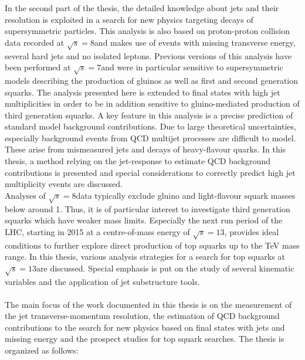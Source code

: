 In the second part of the thesis, the detailed knowledge about jets and their resolution is exploited in a search for new physics targeting decays of supersymmetric particles. This analysis is also based on proton-proton collision data recorded at $\sqrt{s} = 8$\tev and makes use of events with missing transverse energy, several hard jets and no isolated leptons. Previous versions of this analysis have been performed at $\sqrt{s} = 7$\tev and were in particular sensitive to supersymmetric models describing the production of gluinos as well as first and second generation squarks. The analysis presented here is extended to final states with high jet multiplicities in order to be in addition sensitive to gluino-mediated production of third generation squarks. A key feature in this analysis is a precise prediction of standard model background contributions. Due to large theoretical uncertainties, especially background events from QCD multijet processes are difficult to model. These arise from mismeasured jets and decays of heavy-flavour quarks. In this thesis, a method relying on the jet-\pt response to estimate QCD background contributions is presented and special considerations to correctly predict high jet multiplicity events are discussed.  \\
Analyses of $\sqrt{s} = 8$\tev data typically exclude gluino and light-flavour squark masses below around 1\tev. Thus, it is of particular interest to investigate third generation squarks which have weaker mass limits. Especially the next run period of the LHC, starting in 2015 at a centre-of-mass energy of $\sqrt{s} = 13$\tev, provides ideal conditions to further explore direct production of top squarks up to the TeV mass range. In this thesis, various analysis strategies for a search for top squarks at $\sqrt{s} = 13$\tev are discussed. Special emphasis is put on the study of several kinematic variables and the application of jet substructure tools. \\ 
\\
The main focus of the work documented in this thesis is on the measurement of the jet transverse-momentum resolution, the estimation of QCD background contributions to the search for new physics based on final states with jets and missing energy and the prospect studies for top squark searches. The thesis is organized as follows:
